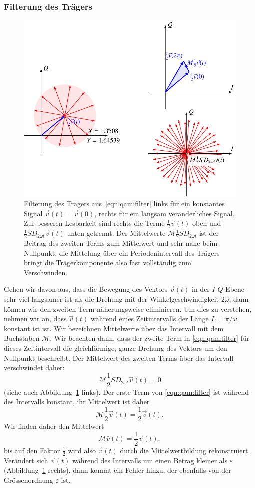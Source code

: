 \subsubsection{Filterung des Trägers}
\begin{figure}
\centering
\includegraphics{applications/qam/images/filter.pdf}
\caption{Filterung des Trägers aus~\eqref{eqn:qam:filter}
links für ein konstantes Signal $\vec{v}(t)=\vec{v}(0)$, rechts
für ein langsam veränderliches Signal.
Zur besseren Lesbarkeit sind rechts die Terme
$\frac12\vec{v}(t)$ oben und $\frac12SD_{2\omega t}\vec{v}(t)$
unten getrennt.
Der Mittelwerte $\mathcal{M}\frac12SD_{2\omega t}$ ist der Beitrag des
zweiten Terms zum Mittelwert und sehr nahe beim Nullpunkt,
die Mittelung über ein Periodenintervall des Trägers bringt die
Trägerkomponente also fast vollständig zum Verschwinden.
\label{figure:qam:filter}}
\end{figure}
Gehen wir davon aus, dass die Bewegung des Vektors $\vec{v}(t)$ in
der $I$-$Q$-Ebene sehr viel langsamer ist als die Drehung mit der
Winkelgeschwindigkeit $2\omega$, dann können wir den zweiten Term
näherungsweise eliminieren.
Um dies zu verstehen, nehmen wir an, dass $\vec{v}(t)$ während eines
Zeitintervalls der Länge $L=\pi/\omega$ konstant ist ist.
Wir bezeichnen Mittelwerte über das Intervall mit dem Buchstaben $\mathcal{M}$.
Wir beachten dann, dass der zweite Term in \eqref{eqn:qam:filter}
für dieses Zeitintervall die gleichförmige, ganze Drehung des Vektors
um den Nullpunkt beschreibt.
Der Mittelwert des zweiten Terms über das Intervall verschwindet daher:
\[
\mathcal{M}\frac12SD_{2\omega t}\vec{v}(t)
=
0
\]
(siehe auch Abbildung~\ref{figure:qam:filter} links).
Der erste Term von \eqref{eqn:qam:filter} ist während des Intervalls
konstant, ihr Mittelwert ist daher
\[
\mathcal{M}\frac12\vec{v}(t)
=
\frac12\vec{v}(t).
\]
Wir finden daher den Mittelwert
\[
\mathcal{M}\hat{v}(t)
=
\frac12\vec{v}(t),
\]
bis auf den Faktor $\frac12$ wird also $\vec{v}(t)$ durch die Mittelwertbildung
rekonstruiert.
Verändert sich $\vec{v}(t)$ während des Intervalls um einen Betrag
kleiner als $\varepsilon$ (Abbildung~\ref{figure:qam:filter} rechts),
dann kommt ein Fehler hinzu, der ebenfalls
von der Grössenordnung $\varepsilon$ ist.

